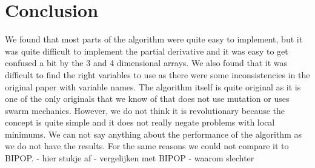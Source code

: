 \documentclass[runningheads]{llncs}
\begin{document}




\section{Conclusion}
We found that most parts of the algorithm were quite easy to implement, but it was quite difficult to implement the partial derivative and it was easy to get confused a bit by the 3 and 4 dimensional arrays. We also found that it was difficult to find the right variables to use as there were some inconsistencies in the original paper with variable names. The algorithm itself is quite original as it is one of the only originals that we know of that does not use mutation or uses swarm mechanics. However, we do not think it is revolutionary because the concept is quite simple and it does not really negate problems with local minimums. We can not say anything about the performance of the algorithm as we do not have the results. For the same reasons we could not compare it to BIPOP.
- hier stukje af
- vergelijken met BIPOP
- waarom slechter
\end{document}
